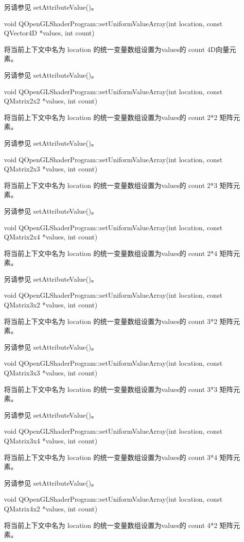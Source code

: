 另请参见 setAttributeValue()。

void QOpenGLShaderProgram::setUniformValueArray(int location, const QVector4D *values, int count)

将当前上下文中名为 location 的统一变量数组设置为values的 count 4D向量元素。

另请参见 setAttributeValue()。

void QOpenGLShaderProgram::setUniformValueArray(int location, const QMatrix2x2 *values, int count)

将当前上下文中名为 location 的统一变量数组设置为values的 count 2*2 矩阵元素。

另请参见 setAttributeValue()。

void QOpenGLShaderProgram::setUniformValueArray(int location, const QMatrix2x3 *values, int count)

将当前上下文中名为 location 的统一变量数组设置为values的 count 2*3 矩阵元素。

另请参见 setAttributeValue()。

void QOpenGLShaderProgram::setUniformValueArray(int location, const QMatrix2x4 *values, int count)

将当前上下文中名为 location 的统一变量数组设置为values的 count 2*4 矩阵元素。

另请参见 setAttributeValue()。

void QOpenGLShaderProgram::setUniformValueArray(int location, const QMatrix3x2 *values, int count)

将当前上下文中名为 location 的统一变量数组设置为values的 count 3*2 矩阵元素。

另请参见 setAttributeValue()。

void QOpenGLShaderProgram::setUniformValueArray(int location, const QMatrix3x3 *values, int count)

将当前上下文中名为 location 的统一变量数组设置为values的 count 3*3 矩阵元素。

另请参见 setAttributeValue()。

void QOpenGLShaderProgram::setUniformValueArray(int location, const QMatrix3x4 *values, int count)

将当前上下文中名为 location 的统一变量数组设置为values的 count 3*4 矩阵元素。

另请参见 setAttributeValue()。

void QOpenGLShaderProgram::setUniformValueArray(int location, const QMatrix4x2 *values, int count)

将当前上下文中名为 location 的统一变量数组设置为values的 count 4*2 矩阵元素。

